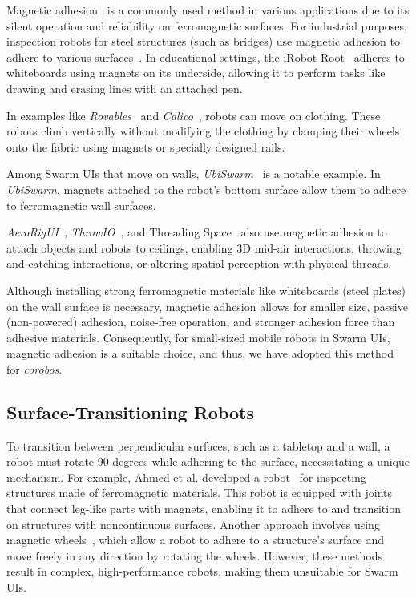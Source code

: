 Magnetic adhesion~\cite{iRobot2023,UbiSwarm2017,Ahmed2022,Takada2017,Matsumura2019,AeroRigUI_CHI2023,ThrowIO_CHI2023,Tripillar2011,R-Track2021,ThreadingSpace2024} is a commonly used method in various applications due to its silent operation and reliability on ferromagnetic surfaces.
For industrial purposes, inspection robots for steel structures (such as bridges) use magnetic adhesion to adhere to various surfaces~\cite{Ahmed2022}.
In educational settings, the iRobot Root\texttrademark~\cite{iRobot2023} adheres to whiteboards using magnets on its underside, allowing it to perform tasks like drawing and erasing lines with an attached pen.

In examples like \textit{Rovables}~\cite{Rovables2016} and \textit{Calico}~\cite{Calico}, robots can move on clothing.
These robots climb vertically without modifying the clothing by clamping their wheels onto the fabric using magnets or specially designed rails.

Among Swarm UIs that move on walls, \textit{UbiSwarm}~\cite{UbiSwarm2017} is a notable example.
In \textit{UbiSwarm}, magnets attached to the robot’s bottom surface allow them to adhere to ferromagnetic wall surfaces.

\textit{AeroRigUI}~\cite{AeroRigUI_CHI2023}, \textit{ThrowIO}~\cite{ThrowIO_CHI2023}, and Threading Space~\cite{ThreadingSpace2024} also use magnetic adhesion to attach objects and robots to ceilings, enabling 3D mid-air interactions, throwing and catching interactions, or altering spatial perception with physical threads.

Although installing strong ferromagnetic materials like whiteboards (steel plates) on the wall surface is necessary, magnetic adhesion allows for smaller size, passive (non-powered) adhesion, noise-free operation, and stronger adhesion force than adhesive materials.
Consequently, for small-sized mobile robots in Swarm UIs, magnetic adhesion is a suitable choice, and thus, we have adopted this method for \textit{corobos}.


\subsection{Surface-Transitioning Robots}
To transition between perpendicular surfaces, such as a tabletop and a wall, a robot must rotate 90 degrees while adhering to the surface, necessitating a unique mechanism.
For example, Ahmed et al. developed a robot~\cite{Ahmed2022} for inspecting structures made of ferromagnetic materials.
This robot is equipped with joints that connect leg-like parts with magnets, enabling it to adhere to and transition on structures with noncontinuous surfaces.
Another approach involves using magnetic wheels~\cite{Matsumura2019,Tripillar2011}, which allow a robot to adhere to a structure’s surface and move freely in any direction by rotating the wheels.
However, these methods result in complex, high-performance robots, making them unsuitable for Swarm UIs.

